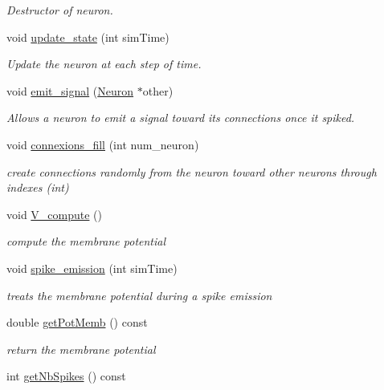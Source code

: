 \begin{DoxyCompactItemize}
\begin{DoxyCompactList}\small\item\em Destructor of neuron. \end{DoxyCompactList}\item 
void \hyperlink{classNeuron_af4c3e28345913e29da87a372e817f3c8}{update\-\_\-state} (int sim\-Time)
\begin{DoxyCompactList}\small\item\em Update the neuron at each step of time. \end{DoxyCompactList}\item 
void \hyperlink{classNeuron_a724ef0ece11309126cda892e354e81e1}{emit\-\_\-signal} (\hyperlink{classNeuron}{Neuron} $\ast$other)
\begin{DoxyCompactList}\small\item\em Allows a neuron to emit a signal toward its connections once it spiked. \end{DoxyCompactList}\item 
void \hyperlink{classNeuron_a95fa7fa0496a9ba86626ad5605c1d6f7}{connexions\-\_\-fill} (int num\-\_\-neuron)
\begin{DoxyCompactList}\small\item\em create connections randomly from the neuron toward other neurons through indexes (int) \end{DoxyCompactList}\item 
void \hyperlink{classNeuron_a78ad401819336b210c9f0a1b7b676e53}{V\-\_\-compute} ()
\begin{DoxyCompactList}\small\item\em compute the membrane potential \end{DoxyCompactList}\item 
void \hyperlink{classNeuron_a9d1f9ce3ee43c74eb0ff15b72256c417}{spike\-\_\-emission} (int sim\-Time)
\begin{DoxyCompactList}\small\item\em treats the membrane potential during a spike emission \end{DoxyCompactList}\item 
double \hyperlink{classNeuron_a8b4af30d823975f3b2ef3ae534f9ae5f}{get\-Pot\-Memb} () const 
\begin{DoxyCompactList}\small\item\em return the membrane potential \end{DoxyCompactList}\item 
int \hyperlink{classNeuron_ab1efa405eb0cd7bac6ca012c961efe5d}{get\-Nb\-Spikes} () const 

\end{DoxyCompactItemize}
